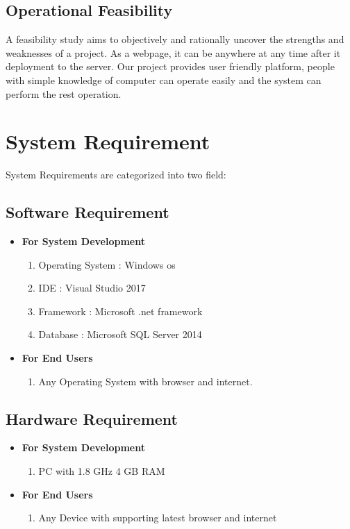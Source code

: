 \subsection{Operational Feasibility}
A feasibility study aims to objectively and rationally uncover the strengths and weaknesses of a project. As a webpage, it can be anywhere at any time after it deployment to the server. Our project provides user friendly platform, people with simple knowledge of computer can operate easily and the system can perform the rest operation.

\newpage
\section{System Requirement}
System Requirements are categorized  into two field:
\subsection{Software Requirement}
\begin{itemize}

\item{}\textbf{For System Development}
 \begin{enumerate}
 \item Operating System : Windows \acs{os}
 \item IDE : Visual Studio 2017
 \item Framework : Microsoft .net framework
 \item Database : Microsoft SQL Server 2014
 \end{enumerate}

\item \textbf{For End Users} 
\begin{enumerate}
\item Any Operating System with browser and internet.
\end{enumerate}

\end{itemize}

\subsection{Hardware Requirement}
\begin{itemize}
\item \textbf{For System  Development}
\begin{enumerate}
\item PC with 1.8 GHz 4 GB RAM
\end{enumerate}
\item \textbf{For End Users}
\begin{enumerate}
\item Any Device with supporting latest browser and internet
\end{enumerate}
\end{itemize}



